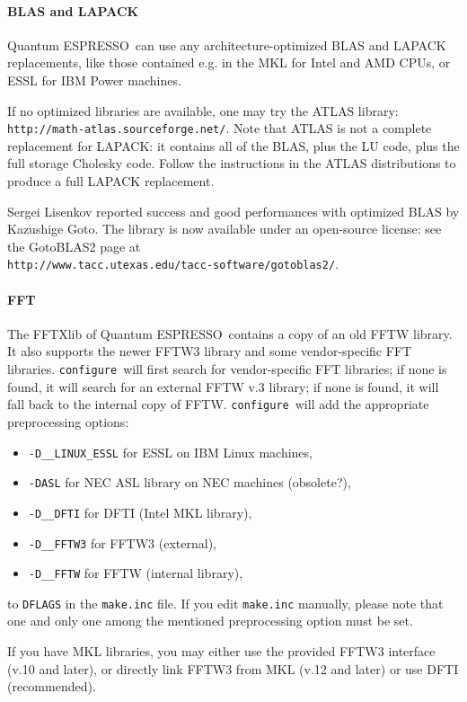 \documentclass[12pt,a4paper]{article}
\def\qe{{\sc Quantum ESPRESSO}}
\def\configure{\texttt{configure}}
\begin{document}
\paragraph{BLAS and LAPACK}
\qe\ can use any architecture-optimized BLAS and LAPACK replacements,
like those contained e.g. in the MKL for Intel and AMD CPUs, or
ESSL for IBM Power machines.

If no optimized libraries are available, one may try the ATLAS library:
\texttt{http://math-atlas.sourceforge.net/}. Note that ATLAS is not
a complete replacement for LAPACK: it contains all of the BLAS, plus the
LU code, plus the full storage Cholesky code. Follow the instructions in the
ATLAS distributions to produce a full LAPACK replacement.

Sergei Lisenkov reported success and good performances with optimized
BLAS by Kazushige Goto. The library is now available under an
open-source license: see the GotoBLAS2 page at \\
\texttt{http://www.tacc.utexas.edu/tacc-software/gotoblas2/}.

\paragraph{FFT}
The FFTXlib of \qe\ contains a copy of an old FFTW library.
It also supports
the newer FFTW3 library and some vendor-specific FFT libraries.
\configure\ will first search for vendor-specific FFT libraries;
if none is found, it will search for an external FFTW v.3 library;
if none is found, it will fall back to the internal  copy of FFTW.
\configure\ will add the appropriate preprocessing options:
\begin{itemize}
\item \texttt{-D\_\_LINUX\_ESSL} for ESSL on IBM Linux machines,
\item \texttt{-DASL} for NEC ASL library on NEC machines (obsolete?),
\item \texttt{-D\_\_DFTI}  for DFTI (Intel MKL library),
\item \texttt{-D\_\_FFTW3} for FFTW3 (external),
\item \texttt{-D\_\_FFTW}  for FFTW (internal library),
\end{itemize}
to \texttt{DFLAGS} in the \texttt{make.inc} file.
If you edit \texttt{make.inc} manually, please note that one and
only one among the mentioned preprocessing option must be set.

If you have MKL libraries, you may either use the provided FFTW3
interface (v.10 and later), or directly link FFTW3 from MKL (v.12
and later) or use DFTI (recommended).
\end{document}
